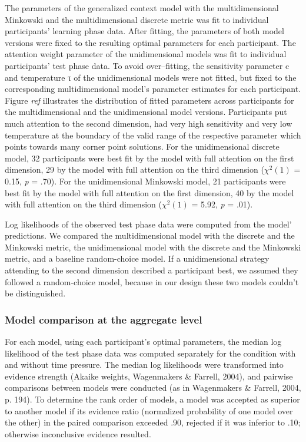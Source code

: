 \documentclass[a4paper,man,natbib]{apa6}
\begin{document}
The parameters of the generalized context model with the multidimensional Minkowski and the multidimensional discrete metric was fit to individual participants’ learning phase data. After fitting, the parameters of both model versions were fixed to the resulting optimal parameters for each participant. The attention weight parameter of the unidimensional models was fit to individual participants’ test phase data. To avoid over--fitting, the sensitivity parameter c and temperature τ of the unidimensional models were not fitted, but fixed to the corresponding multidimensional model’s parameter estimates for each participant. Figure \textit{ref} illustrates the distribution of fitted parameters across participants for the multidimensional and the unidimensional model versions. Participants put much attention to the second dimension, had very high sensitivity and very low temperature at the boundary of the valid range of the respective parameter which points towards many corner point solutions. For the unidimensional discrete model, 32 participants were best fit by the model with full attention on the first dimension, 29 by the model with full attention on the third dimension ($\chi^{2}(1)$ = 0.15, \textit{p} = .70). For the unidimensional Minkowski model, 21 participants were best fit by the model with full attention on the first dimension, 40 by the model with full attention on the third dimension ($\chi^{2}(1)$ = 5.92, \textit{p} = .01).

Log likelihoods of the observed test phase data were computed from the model’ predictions. We compared the multidimensional model with the discrete and the Minkowski metric, the unidimensional model with the discrete and the Minkowski metric, and a baseline random-choice model. If a unidimensional strategy attending to the second dimension described a participant best, we assumed they followed a random-choice model, because in our design these two models couldn't be distinguished. 

\subsubsection{Model comparison at the aggregate level}
For each model, using each participant's optimal parameters, the median log likelihood of the test phase data was computed separately for the condition with and without time pressure. The median log likelihoods were transformed into evidence strength (Akaike weights, Wagenmakers \& Farrell, 2004), and pairwise comparisons between models were conducted (as in Wagenmakers \& Farrell, 2004, p. 194). To determine the rank order of models, a model was accepted as superior to another model if its evidence ratio (normalized probability of one model over the other) in the paired comparison exceeded .90, rejected if it was inferior to .10; otherwise inconclusive evidence resulted. 
\end{document}
